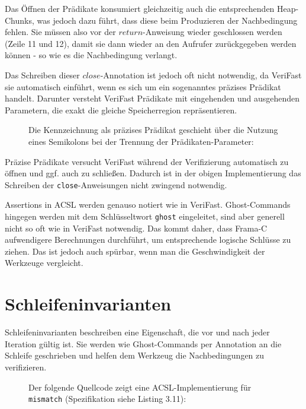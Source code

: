 Das Öffnen der Prädikate konsumiert gleichzeitig auch die entsprechenden Heap-Chunks, was jedoch dazu führt,
dass diese beim Produzieren der Nachbedingung fehlen. Sie müssen also vor der \(return\)-Anweisung
wieder geschlossen werden (Zeile 11 und 12), damit sie dann wieder an den Aufrufer zurückgegeben werden können 
- so wie es die Nachbedingung verlangt.

Das Schreiben dieser \(close\)-Annotation ist jedoch oft nicht notwendig, da VeriFast sie automatisch
einführt, wenn es sich um ein sogenanntes präzises Prädikat handelt. Darunter versteht VeriFast Prädikate mit 
eingehenden und ausgehenden Parametern, die exakt die gleiche Speicherregion repräsentieren. 

\begin{figure}[H]
Die Kennzeichnung als präzises Prädikat geschieht über die Nutzung eines Semikolons bei der Trennung
der Prädikaten-Parameter:


\end{figure}
Präzise Prädikate versucht VeriFast während der Verifizierung automatisch zu öffnen und ggf. auch zu
schließen. Dadurch ist in der obigen Implementierung das Schreiben der \texttt{close}-Anweisungen
nicht zwingend notwendig.

Assertions in ACSL werden genauso notiert wie in VeriFast. Ghost-Commands hingegen werden
mit dem Schlüsseltwort \lstinline{ghost} eingeleitet, sind aber generell nicht so oft wie in
VeriFast notwendig. Das kommt daher, dass Frama-C aufwendigere Berechnungen durchführt, um
entsprechende logische Schlüsse zu ziehen. Das ist jedoch auch spürbar, wenn man die
Geschwindigkeit der Werkzeuge vergleicht.


\section{Schleifeninvarianten}

Schleifeninvarianten beschreiben eine Eigenschaft, die vor und nach jeder Iteration gültig ist. Sie
werden wie Ghost-Commands per Annotation an die Schleife geschrieben und helfen dem Werkzeug die
Nachbedingungen zu verifizieren.

\begin{figure}[H]
Der folgende Quellcode zeigt eine ACSL-Implementierung für \lstinline{mismatch}
(Spezifikation siehe Listing 3.11):

\end{figure}

